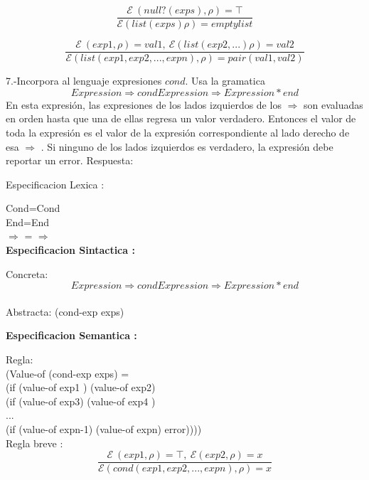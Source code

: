 \documentclass{article}
\begin{document}
$$
\frac{\mathcal{E} \: (null? (exps),\rho) = \top }{\mathcal{E} (list(exps)\rho)=emptylist}
$$


$$
\frac{\mathcal{E} \: (exp1,\rho)=val1, \: \mathcal{E} (list(exp2,...)\rho)=val2 }{\mathcal{E}(list(exp1,exp2,...,expn),\rho)=pair(val1,val2)}
$$




7.-Incorpora al lenguaje expresiones $cond$. Usa la gramatica 
$$ Expression \Rightarrow cond {Expression \Rightarrow Expression}* end$$
En esta expresión, las expresiones de los lados izquierdos de los $\Rightarrow$  son evaluadas en orden
hasta que una de ellas regresa un valor verdadero. Entonces el valor de toda la expresión es
el valor de la expresión correspondiente al lado derecho de esa $\Rightarrow$ . Si ninguno de los lados
izquierdos es verdadero, la expresión debe reportar un error. \textbf\newline
Respuesta: \newline


{Especificacion Lexica :} \newline

Cond=Cond\\

End=End\\ 

$\Rightarrow $ = $\Rightarrow $ \\

\textbf{Especificacion Sintactica :} \newline

Concreta: $$ Expression \Rightarrow cond {Expression \Rightarrow Expression}* end$$ \\

Abstracta: (cond-exp exps)


\textbf{Especificacion Semantica :} \newline

Regla: \\

(Value-of (cond-exp exps) = \\
        (if (value-of exp1 ) (value-of exp2) \\ 
            (if (value-of exp3) (value-of exp4 ) \\
                ... \\ 
                    (if (value-of expn-1) (value-of expn) error)))) \\

Regla breve :\\

$$
\frac{\mathcal{E} \: (exp1,\rho)=\top, \: \mathcal{E} (exp2,\rho)=x }{\mathcal{E}(cond(exp1,exp2,...,expn),\rho)=x}
$$
\end{document}
